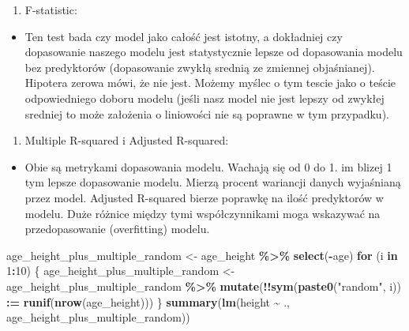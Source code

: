 \documentclass[
]{article}
\newenvironment{Shaded}{\begin{snugshade}}{\end{snugshade}}
\newcommand{\ControlFlowTok}[1]{\textcolor[rgb]{0.13,0.29,0.53}{\textbf{#1}}}
\newcommand{\DecValTok}[1]{\textcolor[rgb]{0.00,0.00,0.81}{#1}}
\newcommand{\ErrorTok}[1]{\textcolor[rgb]{0.64,0.00,0.00}{\textbf{#1}}}
\newcommand{\KeywordTok}[1]{\textcolor[rgb]{0.13,0.29,0.53}{\textbf{#1}}}
\newcommand{\NormalTok}[1]{#1}
\newcommand{\OperatorTok}[1]{\textcolor[rgb]{0.81,0.36,0.00}{\textbf{#1}}}
\newcommand{\StringTok}[1]{\textcolor[rgb]{0.31,0.60,0.02}{#1}}
\providecommand{\tightlist}{%
  \setlength{\itemsep}{0pt}\setlength{\parskip}{0pt}}
\begin{document}
\begin{enumerate}
\def\labelenumi{\arabic{enumi}.}
\setcounter{enumi}{1}
\tightlist
\item
  F-statistic:
\end{enumerate}

\begin{itemize}
\tightlist
\item
  Ten test bada czy model jako całość jest istotny, a dokładniej czy
  dopasowanie naszego modelu jest statystycznie lepsze od dopasowania
  modelu bez predyktorów (dopasowanie zwykłą srednią ze zmiennej
  objaśnianej). Hipotera zerowa mówi, że nie jest. Możemy myślec o tym
  tescie jako o teście odpowiedniego doboru modelu (jeśli nasz model nie
  jest lepszy od zwykłej sredniej to może założenia o liniowości nie są
  poprawne w tym przypadku).
\end{itemize}

\begin{enumerate}
\def\labelenumi{\arabic{enumi}.}
\setcounter{enumi}{2}
\tightlist
\item
  Multiple R-squared i Adjusted R-squared:
\end{enumerate}

\begin{itemize}
\tightlist
\item
  Obie są metrykami dopasowania modelu. Wachają się od 0 do 1. im blizej
  1 tym lepsze dopasowanie modelu. Mierzą procent wariancji danych
  wyjaśnianą przez model. Adjusted R-squared bierze poprawkę na ilość
  predyktorów w modelu. Duże różnice między tymi współczynnikami moga
  wskazywać na przedopasowanie (overfitting) modelu.
\end{itemize}

\begin{Shaded}
\begin{Highlighting}[]
\NormalTok{age\_height\_plus\_multiple\_random  \textless{}{-}}\StringTok{ }\NormalTok{age\_height }\OperatorTok{\%\textgreater{}\%}
\StringTok{  }\KeywordTok{select}\NormalTok{(}\OperatorTok{{-}}\NormalTok{age)}
\ControlFlowTok{for}\NormalTok{ (i }\ControlFlowTok{in} \DecValTok{1}\OperatorTok{:}\DecValTok{10}\NormalTok{) \{}
\NormalTok{  age\_height\_plus\_multiple\_random \textless{}{-}}\StringTok{ }\NormalTok{age\_height\_plus\_multiple\_random }\OperatorTok{\%\textgreater{}\%}
\StringTok{  }\KeywordTok{mutate}\NormalTok{(}\OperatorTok{!!}\KeywordTok{sym}\NormalTok{(}\KeywordTok{paste0}\NormalTok{(}\StringTok{"random"}\NormalTok{, i)) }\OperatorTok{:}\ErrorTok{=}\StringTok{ }\KeywordTok{runif}\NormalTok{(}\KeywordTok{nrow}\NormalTok{(age\_height)))}
\NormalTok{\}}
\KeywordTok{summary}\NormalTok{(}\KeywordTok{lm}\NormalTok{(height }\OperatorTok{\textasciitilde{}}\StringTok{ }\NormalTok{., age\_height\_plus\_multiple\_random))}
\end{Highlighting}
\end{Shaded}
\end{document}
